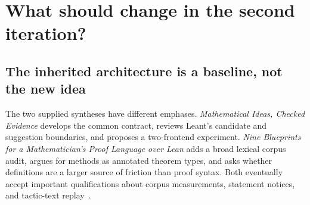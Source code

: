 \documentclass[11pt,a4paper]{article}
\theoremstyle{definition}
\theoremstyle{remark}
\begin{document}
\begin{abstract}
The first Brainstorm iteration converged on a sensible architecture: Lean-hosted mathematical steps, fixed statements, scoped obligations, ordinary theorem-backed methods, honest synthesis outcomes, and retained evidence. Repeating that consensus would contribute little. This article proposes a specific extension: an object-centered mathematical workbench in which \emph{certified computations and certified changes of representation are first-class proof steps}. The central interface is relational. Exact equality, equality on a domain, equality of germs, equivalence of solution sets, agreement of finite series coefficients, and numerical enclosure are different claims with different composition rules. A computer algebra system may optimize the representation of a fixed mathematical object, but may not silently change the object, its domain, or the strength of the claim.

The design combines theorem-annotated methods with verified computational kernels and independently checked certificates. It gives explicit rules for dependent guard composition, directional abstraction, and precision propagation. Worked developments cover binomial inversion over additive commutative groups, autonomous derivatives with a symbolic Lambert-type polynomial recurrence, Abel-series coefficients over arbitrary commutative rational algebras, and an exact root enclosure. A small executable companion checks 2,475 finite arithmetic instances and mutation tests; its limited evidential role is stated precisely. The implementation proposal reuses Lean and Leant, starts with a compact polynomial-certificate path, and compares ordinary Lean and a mathematical frontend over identical libraries. Success is reduced mathematical bookkeeping and better reading and repair, not a new syntax at any cost.
\end{abstract}
\begingroup
\small
\setlength{\parskip}{0pt}
\makeatletter
\renewcommand*\l@section{\@dottedtocline{1}{0em}{2em}}
\makeatother
\tableofcontents
\endgroup
\clearpage

\section{What should change in the second iteration?}\label{sec:second}
\subsection{The inherited architecture is a baseline, not the new idea}
The two supplied syntheses have different emphases. \emph{Mathematical Ideas, Checked Evidence} develops the common contract, reviews Leant's candidate and suggestion boundaries, and proposes a two-frontend experiment. \emph{Nine Blueprints for a Mathematician's Proof Language over Lean} adds a broad lexical corpus audit, argues for methods as annotated theorem types, and asks whether definitions are a larger source of friction than proof syntax. Both eventually accept important qualifications about corpus measurements, statement notices, and tactic-text replay~\cite{synA,synB}.
\end{document}
